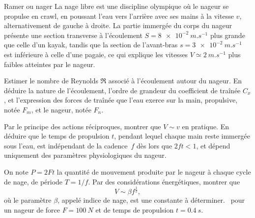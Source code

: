 \begin{exo}[PC][3][TD]{Ramer ou nager}
  La nage libre est une discipline olympique où le nageur se propulse en crawl, en poussant l'eau vers l'arrière avec ses mains à la vitesse $v$, alternativement de gauche à droite. La partie immergée du corps du nageur présente une section transverse à l'écoulement $S=\SI{8e-2}{m.s^{-1}}$ plus grande que celle d'un kayak, tandis que la section de l'avant-bras $s=\SI{3e-2}{m.s^{-1}}$ est inférieure à celle d'une pagaie, ce qui explique les vitesses $V\simeq\SI{2}{m.s^{-1}}$ plus faibles atteintes par le nageur. 
  \begin{quest}
    \item	Estimer le nombre de Reynolds $\Re$ associé à l'écoulement autour du nageur. En déduire la nature de l'écoulement, l'ordre de grandeur du coefficient de traînée $C_x$, et l'expression des forces de traînée que l'eau exerce sur la main, propulsive, notée $F_m$, et le nageur,  notée $F_n$.
    \item  Par le principe des actions réciproques, montrer que  $V\sim v$ en pratique. En déduire que le temps de propulsion $t$, pendant lequel chaque main reste immergée sous l'eau, est indépendant de la cadence~$f$ dès lors que $2ft<1$, et dépend uniquement des paramètres physiologiques du nageur.
    \item On note $P=2Ft$ la quantité de mouvement produite par le nageur à chaque cycle de nage, de période $T=1/f$. Par des considérations énergétiques, montrer que 
    \begin{equation}
      V \sim \beta f^{\frac{1}{2}},
    \end{equation}
    où le paramètre $\beta$, appelé indice de nage, est une constante à déterminer. \AN~pour un nageur de force $F = \SI{100}{N}$ et de temps de propulsion $t=\SI{0.4}{s}$.
  \end{quest}
\end{exo}

